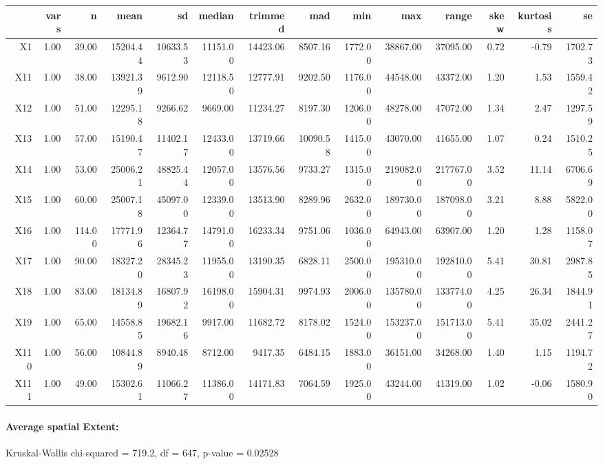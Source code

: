 \begin{tabular}{rrrrrrrrrrrrrr}
	\toprule
	& vars & n & mean & sd & median & trimmed & mad & min & max & range & skew & kurtosis & se \\ 
	\midrule
	X1 & 1.00 & 39.00 & 15204.44 & 10633.53 & 11151.00 & 14423.06 & 8507.16 & 1772.00 & 38867.00 & 37095.00 & 0.72 & -0.79 & 1702.73 \\ 
	X11 & 1.00 & 38.00 & 13921.39 & 9612.90 & 12118.50 & 12777.91 & 9202.50 & 1176.00 & 44548.00 & 43372.00 & 1.20 & 1.53 & 1559.42 \\ 
	X12 & 1.00 & 51.00 & 12295.18 & 9266.62 & 9669.00 & 11234.27 & 8197.30 & 1206.00 & 48278.00 & 47072.00 & 1.34 & 2.47 & 1297.59 \\ 
	X13 & 1.00 & 57.00 & 15190.47 & 11402.17 & 12433.00 & 13719.66 & 10090.58 & 1415.00 & 43070.00 & 41655.00 & 1.07 & 0.24 & 1510.25 \\ 
	X14 & 1.00 & 53.00 & 25006.21 & 48825.44 & 12057.00 & 13576.56 & 9733.27 & 1315.00 & 219082.00 & 217767.00 & 3.52 & 11.14 & 6706.69 \\ 
	X15 & 1.00 & 60.00 & 25007.18 & 45097.00 & 12339.00 & 13513.90 & 8289.96 & 2632.00 & 189730.00 & 187098.00 & 3.21 & 8.88 & 5822.00 \\ 
	X16 & 1.00 & 114.00 & 17771.96 & 12364.77 & 14791.00 & 16233.34 & 9751.06 & 1036.00 & 64943.00 & 63907.00 & 1.20 & 1.28 & 1158.07 \\ 
	X17 & 1.00 & 90.00 & 18327.20 & 28345.23 & 11955.00 & 13190.35 & 6828.11 & 2500.00 & 195310.00 & 192810.00 & 5.41 & 30.81 & 2987.85 \\ 
	X18 & 1.00 & 83.00 & 18134.89 & 16807.92 & 16198.00 & 15904.31 & 9974.93 & 2006.00 & 135780.00 & 133774.00 & 4.25 & 26.34 & 1844.91 \\ 
	X19 & 1.00 & 65.00 & 14558.85 & 19682.16 & 9917.00 & 11682.72 & 8178.02 & 1524.00 & 153237.00 & 151713.00 & 5.41 & 35.02 & 2441.27 \\ 
	X110 & 1.00 & 56.00 & 10844.89 & 8940.48 & 8712.00 & 9417.35 & 6484.15 & 1883.00 & 36151.00 & 34268.00 & 1.40 & 1.15 & 1194.72 \\ 
	X111 & 1.00 & 49.00 & 15302.61 & 11066.27 & 11386.00 & 14171.83 & 7064.59 & 1925.00 & 43244.00 & 41319.00 & 1.02 & -0.06 & 1580.90 \\ 
	\bottomrule
\end{tabular}

\paragraph{Average spatial Extent:}
Kruskal-Wallis chi-squared = 719.2, df = 647, p-value = 0.02528

